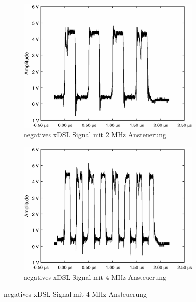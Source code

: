 \begin{figure}[h!]
\centering
	\begin{subfigure}[t]{0.31\textwidth}
    \centering
    	\includegraphics[width=\textwidth, trim= 0mm 0mm 0mm 0mm, clip=true]{images/tests/tx/2MHz-TX.eps}%
    	\caption{negatives xDSL Signal mit 2 MHz Ansteuerung}
	    \label{fig:tx2s}
	\end{subfigure}%
    \hfil %
    \begin{subfigure}[t]{0.31\textwidth}
    	\includegraphics[width=\textwidth, trim= 0mm 0mm 0mm 0mm, clip=true]{images/tests/tx/4MHz-TX.eps}%
    	\caption{negatives xDSL Signal mit 4 MHz Ansteuerung}

\end{subfigure}
\end{figure}
